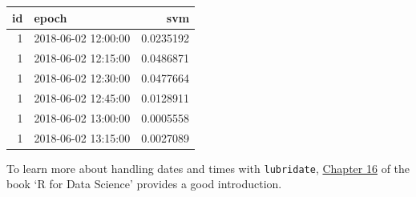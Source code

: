 \documentclass[]{book}
\newenvironment{Shaded}{\begin{snugshade}}{\end{snugshade}}
\newcommand{\KeywordTok}[1]{\textcolor[rgb]{0.13,0.29,0.53}{\textbf{#1}}}
\newcommand{\DataTypeTok}[1]{\textcolor[rgb]{0.13,0.29,0.53}{#1}}
\newcommand{\DecValTok}[1]{\textcolor[rgb]{0.00,0.00,0.81}{#1}}
\newcommand{\StringTok}[1]{\textcolor[rgb]{0.31,0.60,0.02}{#1}}
\newcommand{\CommentTok}[1]{\textcolor[rgb]{0.56,0.35,0.01}{\textit{#1}}}
\newcommand{\OperatorTok}[1]{\textcolor[rgb]{0.81,0.36,0.00}{\textbf{#1}}}
\newcommand{\NormalTok}[1]{#1}
\begin{document}
\begin{Shaded}
\end{Shaded}

\begin{tabular}{r|l|r}
\hline
id & epoch & svm\\
\hline
1 & 2018-06-02 12:00:00 & 0.0235192\\
\hline
1 & 2018-06-02 12:15:00 & 0.0486871\\
\hline
1 & 2018-06-02 12:30:00 & 0.0477664\\
\hline
1 & 2018-06-02 12:45:00 & 0.0128911\\
\hline
1 & 2018-06-02 13:00:00 & 0.0005558\\
\hline
1 & 2018-06-02 13:15:00 & 0.0027089\\
\hline
\end{tabular}

To learn more about handling dates and times with \texttt{lubridate},
\href{http://r4ds.had.co.nz/dates-and-times.html}{Chapter 16} of the
book `R for Data Science' \citep{wickham2016r} provides a good
introduction.
\end{document}
